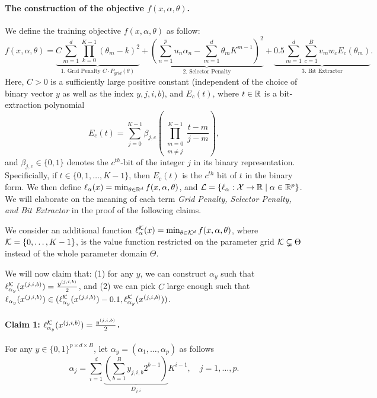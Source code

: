     \paragraph{The construction of the objective $f(x, \alpha, \theta)$.} We define the training objective $f(x, \alpha, \theta)$ as follow:
    \[
        f(x, \alpha, \theta)  = \underbrace{C \sum_{m=1}^d \prod_{k=0}^{K-1} (\theta_m - k)^2}_{\text{1. Grid Penalty $C \cdot P_{grid}(\theta)$}} + \underbrace{\left( \sum_{n=1}^p u_n \alpha_n - \sum_{m=1}^d \theta_m K^{m-1} \right)^2}_{\text{2. Selector Penalty}} + \underbrace{0.5 \sum_{m=1}^d \sum_{c=1}^B v_m w_c E_c(\theta_m)}_{\text{3. Bit Extractor}}.
    \]
         Here, $C > 0$ is a sufficiently large positive constant (independent of the choice of binary vector $y$ as well as the index $y, j, i, b$), and $E_c(t)$, where $t \in \mathbb{R}$ is a bit-extraction polynomial
        \[
            E_c(t) = \sum_{j=0}^{K-1} \beta_{j, c} \left( \prod_{\substack{m=0 \\ m \neq j}}^{K-1} \frac{t - m}{j - m} \right),
        \]        
        and $\beta_{j, c} \in \{0, 1\}$ denotes the $c^{th}$-bit of the integer $j$ in its binary representation. Specificially, if $t \in \{0, 1, \dots, K - 1\}$, then $E_c(t)$ is the $c^{th}$ bit of $t$ in the binary form. 
        We then define $\ell_\alpha(x) = \min_{\theta \in \mathbb{R}^d}f(x, \alpha, \theta)$, and $\mathcal{L} = \{\ell_\alpha: \mathcal{X} \rightarrow \mathbb{R} \mid \alpha \in \mathbb{R}^p\}$. We will elaborate on the meaning of each term \textit{Grid Penalty, Selector Penalty, and Bit Extractor} in the proof of the following claims.

        We consider an additional function $\ell^{\mathcal{K}}_\alpha(x) = \min_{\theta \in \mathcal{K}^d} f(x, \alpha, \theta)$, where $\mathcal{K} = \{0, \dots, K - 1\}$, is the value function restricted on the parameter grid $\mathcal{K} \subsetneq \Theta$ instead of the whole parameter domain $\Theta$.

    We will now claim that: (1) for any $y$, we can construct $\alpha_y$ such that $\ell^{\mathcal{K}}_{\alpha_y}(x^{(j, i, b)}) = \frac{y^{(j, i, b)}}{2}$, and (2) we can pick $C$ large enough such that $\ell_{\alpha_y}(x^{(j, i, b)}) \in (\ell^{\mathcal{K}}_{\alpha_y}(x^{(j, i, b)}) - 0.1, \ell^{\mathcal{K}}_{\alpha_y}(x^{(j, i, b)}))$.

    \paragraph{Claim 1: $\ell^{\mathcal{K}}_{\alpha_y}(x^{(j, i, b)}) = \frac{y^{(j, i, b)}}{2}$.} For any $y \in \{0, 1\}^{p \times d \times B}$, let $\alpha_y = (\alpha_1, \dots, \alpha_p)$ as follows
    \begin{equation} \label{eq:alpha-construction}
        \alpha_j = \sum_{i=1}^d \underbrace{\left( \sum_{b=1}^B y_{j, i, b} 2^{b-1} \right)}_{D_{j,i}} K^{i-1}, \quad j = 1, \dots, p.
    \end{equation}
    
